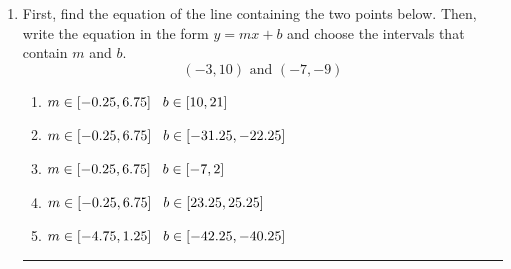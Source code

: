 \documentclass[14pt]{extbook}
\newcommand{\litem}[1]{\item#1\hspace*{-1cm}\rule{\textwidth}{0.4pt}}
\begin{document}
\begin{enumerate}
{\begin{enumerate}[label=\Alph*.]
\end{enumerate} }
\litem{
First, find the equation of the line containing the two points below. Then, write the equation in the form $ y=mx+b $ and choose the intervals that contain $m$ and $b$.\[ (-3, 10) \text{ and } (-7, -9) \]\begin{enumerate}[label=\Alph*.]
\item \( m \in [-0.25, 6.75] \hspace*{3mm} b \in [10, 21] \)
\item \( m \in [-0.25, 6.75] \hspace*{3mm} b \in [-31.25, -22.25] \)
\item \( m \in [-0.25, 6.75] \hspace*{3mm} b \in [-7, 2] \)
\item \( m \in [-0.25, 6.75] \hspace*{3mm} b \in [23.25, 25.25] \)
\item \( m \in [-4.75, 1.25] \hspace*{3mm} b \in [-42.25, -40.25] \)

\end{enumerate} }
\end{enumerate}
\end{document}
